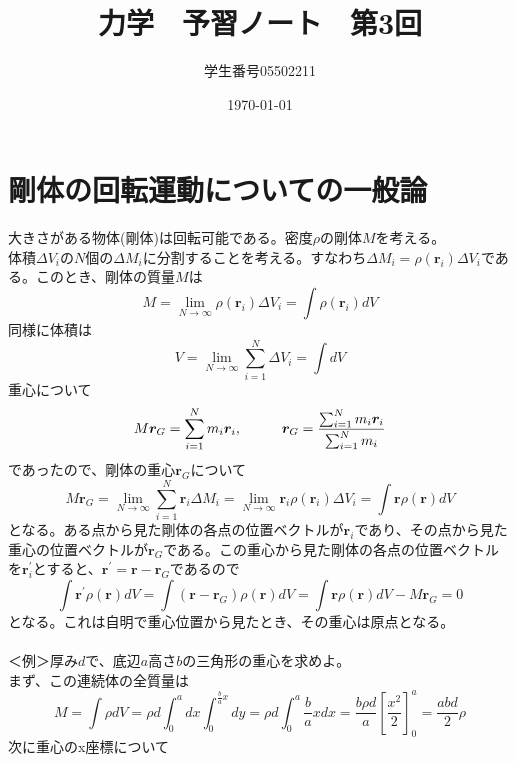 \documentclass{jsarticle}
\title{力学　予習ノート　第3回}
\author{学生番号05502211}
\date{\today}
\begin{document}
\maketitle
\section{剛体の回転運動についての一般論} 
大きさがある物体(剛体)は回転可能である。密度\(\rho\)の剛体\(M\)を考える。\\
体積\(\Delta V_{i}\)の\(N\)個の\(\Delta M_{i}\)に分割することを考える。すなわち\(\Delta M_{i}=\rho(\bm{r}_{i})\Delta V_{i}\)である。このとき、剛体の質量\(M\)は
\begin{equation}
\displaystyle
M=\lim_{N\to\infty}\rho(\bm{r}_{i})\Delta V_{i}=\int\rho(\bm{r}_{i})dV
\end{equation}
同様に体積は
\begin{equation}
V=\lim_{N\to\infty}\sum_{i=1}^{N}\Delta V_{i}=\int dV
\end{equation}
重心について
\begin{equation}
\displaystyle
M\bm{r}_{G}=\sum_{i=1}^{N}m_{i}\bm{r}_{i},\hspace{10mm}\bm{r}_{G}=\frac{\sum_{i=1}^{N}m_{i}\bm{r}_{i}}{\sum_{i=1}^{N}m_{i}}
\end{equation}
であったので、剛体の重心\(\bm{r}_{G}\)について
\begin{equation}
\displaystyle
M\bm{r}_{G}=\lim_{N\to\infty}\sum_{i=1}^{N}\bm{r}_{i}\Delta M_{i}=\lim_{N\to\infty}\bm{r}_{i}\rho(\bm{r}_{i})\Delta V_{i}=\int\bm{r}\rho(\bm{r})dV
\end{equation}
となる。ある点から見た剛体の各点の位置ベクトルが\(\bm{r}_{i}\)であり、その点から見た重心の位置ベクトルが\(\bm{r}_{G}\)である。この重心から見た剛体の各点の位置ベクトルを\(\bm{r}^{\prime}_{i}\)とすると、\(\bm{r}^{\prime}=\bm{r}-\bm{r}_{G}\)であるので
\begin{equation}
\displaystyle
\int\bm{r}^{\prime}\rho(\bm{r})dV=\int(\bm{r}-\bm{r}_{G})\rho(\bm{r})dV=\int\bm{r}\rho(\bm{r})dV-M\bm{r}_{G}=0
\end{equation}
となる。これは自明で重心位置から見たとき、その重心は原点となる。\\
\\
＜例＞厚み\(d\)で、底辺\(a\)高さ\(b\)の三角形の重心を求めよ。\\
まず、この連続体の全質量は
\[M=\int\rho dV=\rho d\int_{0}^{a}dx\int_{0}^{\frac{b}{a}x}dy=\rho d\int_{0}^{a}\frac{b}{a}xdx=\frac{b\rho d}{a}\left[\frac{x^2}{2}\right]_{0}^{a}=\frac{abd}{2}\rho\]
次に重心のx座標について
\end{document}
